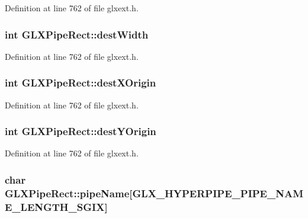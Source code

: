 Definition at line 762 of file glxext.h.

\hypertarget{struct_g_l_x_pipe_rect_a3c07991d2a8fb6e973eae834650b3dad}{
\subsubsection[{destWidth}]{\setlength{\rightskip}{0pt plus 5cm}int {\bf GLXPipeRect::destWidth}}}
\label{struct_g_l_x_pipe_rect_a3c07991d2a8fb6e973eae834650b3dad}


Definition at line 762 of file glxext.h.

\hypertarget{struct_g_l_x_pipe_rect_a8b7b941894ad3420326d7e9fa885bb71}{
\subsubsection[{destXOrigin}]{\setlength{\rightskip}{0pt plus 5cm}int {\bf GLXPipeRect::destXOrigin}}}
\label{struct_g_l_x_pipe_rect_a8b7b941894ad3420326d7e9fa885bb71}


Definition at line 762 of file glxext.h.

\hypertarget{struct_g_l_x_pipe_rect_aef7766b02ef07c20a11e89da5878b469}{
\subsubsection[{destYOrigin}]{\setlength{\rightskip}{0pt plus 5cm}int {\bf GLXPipeRect::destYOrigin}}}
\label{struct_g_l_x_pipe_rect_aef7766b02ef07c20a11e89da5878b469}


Definition at line 762 of file glxext.h.

\hypertarget{struct_g_l_x_pipe_rect_aa4c4f60e9647705ddefa10f95a37cb79}{
\subsubsection[{pipeName}]{\setlength{\rightskip}{0pt plus 5cm}char {\bf GLXPipeRect::pipeName}\mbox{[}GLX\_\-HYPERPIPE\_\-PIPE\_\-NAME\_\-LENGTH\_\-SGIX\mbox{]}}}
\label{struct_g_l_x_pipe_rect_aa4c4f60e9647705ddefa10f95a37cb79}


